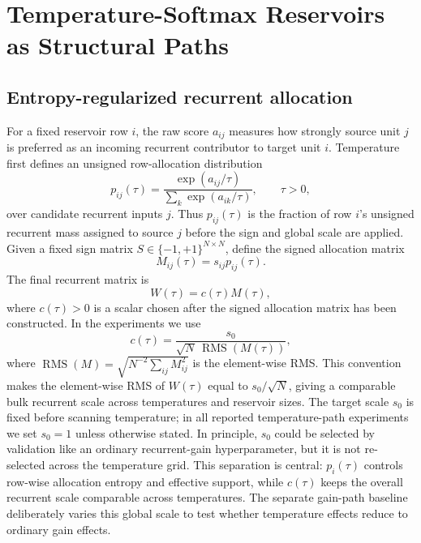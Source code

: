 \documentclass[preprint,12pt,authoryear]{elsarticle}
\begin{document}
\section{Temperature-Softmax Reservoirs as Structural Paths}
\label{sec:structural_path}


\subsection{Entropy-regularized recurrent allocation}

For a fixed reservoir row $i$, the raw score $a_{ij}$ measures how strongly source unit $j$ is preferred as an incoming recurrent contributor to target unit $i$. Temperature first defines an unsigned row-allocation distribution
\begin{equation}
  p_{ij}(\tau)=\frac{\exp(a_{ij}/\tau)}{\sum_k \exp(a_{ik}/\tau)},\qquad \tau>0,
  \label{eq:row_softmax}
\end{equation}
over candidate recurrent inputs $j$. Thus $p_{ij}(\tau)$ is the fraction of row $i$'s unsigned recurrent mass assigned to source $j$ before the sign and global scale are applied. Given a fixed sign matrix $S\in\{-1,+1\}^{N\times N}$, define the signed allocation matrix
\begin{equation}
  M_{ij}(\tau)=s_{ij}p_{ij}(\tau).
  \label{eq:signed_allocation}
\end{equation}
The final recurrent matrix is
\begin{equation}
  W(\tau)=c(\tau)M(\tau),
  \label{eq:scaled_recurrent_matrix}
\end{equation}
where $c(\tau)>0$ is a scalar chosen after the signed allocation matrix has been constructed. In the experiments we use
\begin{equation}
  c(\tau)=\frac{s_0}{\sqrt{N}\,\operatorname{RMS}(M(\tau))},
  \label{eq:scale_normalization}
\end{equation}
where $\operatorname{RMS}(M)=\sqrt{N^{-2}\sum_{ij}M_{ij}^2}$ is the element-wise RMS. This convention makes the element-wise RMS of $W(\tau)$ equal to $s_0/\sqrt{N}$, giving a comparable bulk recurrent scale across temperatures and reservoir sizes. The target scale $s_0$ is fixed before scanning temperature; in all reported temperature-path experiments we set $s_0=1$ unless otherwise stated. In principle, $s_0$ could be selected by validation like an ordinary recurrent-gain hyperparameter, but it is not re-selected across the temperature grid. This separation is central: $p_i(\tau)$ controls row-wise allocation entropy and effective support, while $c(\tau)$ keeps the overall recurrent scale comparable across temperatures. The separate gain-path baseline deliberately varies this global scale to test whether temperature effects reduce to ordinary gain effects.
\end{document}
